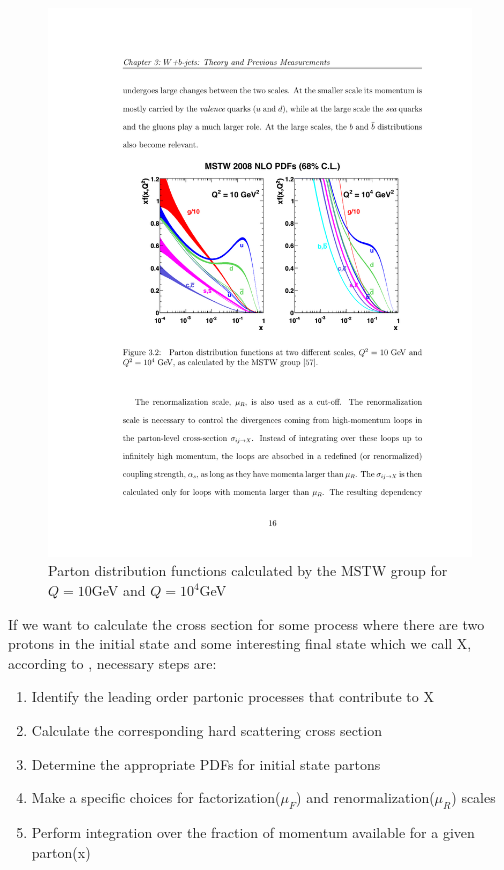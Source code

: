 \begin{figure}[htbp]
	\centering
		\includegraphics{Figures/MSTW.pdf}
	\caption[Parton distribution functions for different momentum transfers]{Parton distribution functions calculated by the MSTW group for $Q=10$GeV and $Q=10^4$GeV \citep{Martin:2009iq}}
	\label{fig:MSTW}
\end{figure}


If we want to calculate the cross section for some process where there are two protons in the initial state and some interesting final state which we call X, according to \citep{Campbell:2006wx}, necessary steps are:
\begin{enumerate}
	\item Identify the leading order partonic processes that contribute to X
	\item Calculate the corresponding hard scattering cross section
	\item Determine the appropriate PDFs for initial state partons
	\item Make a specific choices for factorization($\mu_F$) and renormalization($\mu_R$) scales
	\item Perform integration over the fraction of momentum available for a given parton(x)  
\end{enumerate}



